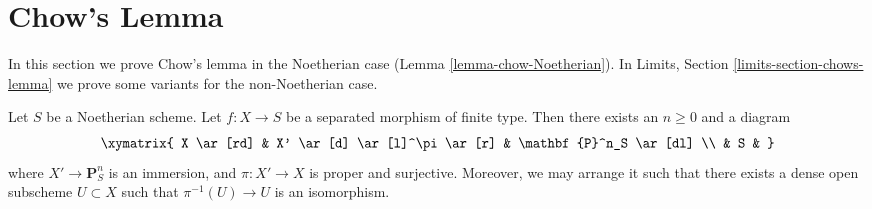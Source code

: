 \section{Chow's Lemma}
\label{section-chows-lemma}

\noindent
In this section we prove Chow's lemma in the Noetherian
case (Lemma \ref{lemma-chow-Noetherian}).
In
Limits, Section \ref{limits-section-chows-lemma}
we prove some variants for the non-Noetherian case.

\begin{lemma}
\label{lemma-chow-Noetherian}
Let $S$ be a Noetherian scheme.
Let $f : X \to S$ be a separated morphism of finite type.
Then there exists an $n \geq 0$ and a diagram
$$
\xymatrix{
X \ar[rd] & X' \ar[d] \ar[l]^\pi \ar[r] & \mathbf{P}^n_S \ar[dl] \\
& S &
}
$$
where $X' \to \mathbf{P}^n_S$ is an immersion, and
$\pi : X' \to X$ is proper and surjective. Moreover, we may
arrange it such that there exists a dense open subscheme
$U \subset X$ such that $\pi^{-1}(U) \to U$ is an isomorphism.
\end{lemma}

